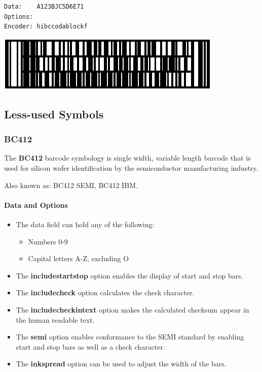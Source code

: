 \begin{verbatim}
Data:    A123BJC5D6E71
Options: 
Encoder: hibccodablockf
\end{verbatim}

\includegraphics{images/hibccodablockf-1.eps}

\hypertarget{less-used-symbols}{%
\subsection{Less-used Symbols}\label{less-used-symbols}}

\hypertarget{bc412}{%
\subsubsection{BC412}\label{bc412}}

The \textbf{BC412} barcode symbology is single width, variable length
barcode that is used for silicon wafer identification by the
semiconductor manufacturing industry.

Also known as: BC412 SEMI, BC412 IBM.

\hypertarget{data-and-options-59}{%
\paragraph{Data and Options}\label{data-and-options-59}}

\begin{itemize}
\tightlist
\item
  The data field can hold any of the following:

  \begin{itemize}
  \tightlist
  \item
    Numbers 0-9
  \item
    Capital letters A-Z, excluding O
  \end{itemize}
\item
  The \textbf{includestartstop} option enables the display of start and
  stop bars.
\item
  The \textbf{includecheck} option calculates the check character.
\item
  The \textbf{includecheckintext} option makes the calculated checksum
  appear in the human readable text.
\item
  The \textbf{semi} option enables conformance to the SEMI standard by
  enabling start and stop bars as well as a check character.
\item
  The \textbf{inkspread} option can be used to adjust the width of the
  bars.
\end{itemize}

